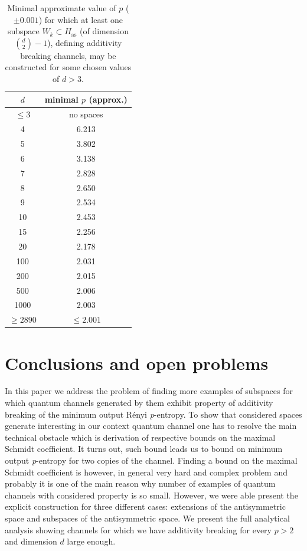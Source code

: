 \documentclass[reqno]{amsart}
\theoremstyle{plain}
\theoremstyle{note}
\newcommand{\aspace}{H_{\mathrm{as}}}
\begin{document}
\begin{table}[ht]
    \caption{Minimal approximate value of $p$ ($\pm 0.001$) for which at least one subspace $W_k \subset \aspace$ (of dimension $\binom{d}{2}-1$), defining additivity breaking channels, may be constructed for some chosen values of $d > 3$.}
    \label{tab:MinimalP_Subspaces}
    \centering
    \begin{tabular}{|c|c|}\hline
        $d$           & minimal $p$ (approx.) \\ \hline
        $\leqslant 3$ & no spaces   \\
        4             & 6.213 \\
        5             & 3.802 \\
        6             & 3.138 \\
        7             & 2.828 \\
        8             & 2.650 \\
        9             & 2.534 \\
        10            & 2.453 \\
        15            & 2.256 \\
        20            & 2.178 \\
        100           & 2.031 \\
        200           & 2.015 \\
        500           & 2.006 \\
        1000       & 2.003 \\
        $\geqslant 2890$ & $\leqslant 2.001$ \\ \hline
    \end{tabular}
\end{table}

 \section{Conclusions and open problems}
In this paper we address the problem of finding more examples of subspaces for which quantum channels generated by them exhibit property of additivity breaking of the minimum output Rényi \textit{p}-entropy. To show that considered spaces generate interesting in our context quantum channel one has to resolve the main technical obstacle which is derivation of respective bounds on the maximal Schmidt coefficient. It turns out, such bound leads us to bound on minimum output \textit{p}-entropy for two copies of the channel. Finding a bound on the maximal Schmidt coefficient is however, in general very hard and complex problem and probably it is one of the main reason why number of examples of quantum channels with considered property is so small. 
However, we were able present the explicit construction for three different cases: extensions of the antisymmetric space and subspaces of the antisymmetric space. We present the full analytical analysis showing channels for which we have additivity breaking for every $p>2$ and dimension $d$ large enough.
\end{document}
